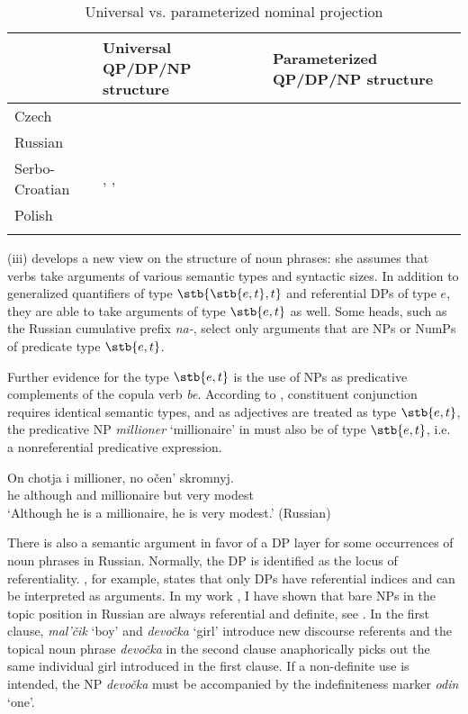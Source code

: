 \documentclass[output=paper,
colorlinks,
citecolor=brown,
newtxmath
]{langscibook}
\begin{document}
\begin{table}
\centering
\begin{tabularx}{\textwidth}{lQQ}
\lsptoprule
& Universal QP/DP/NP structure & Parameterized QP/DP/NP structure \tabularnewline
\midrule
Czech & \citet{Veselovska1995,Veselovska2001} & \citet{Corver1990} \tabularnewline
\midrule
Russian & \citet{Pereltsvaig2007,Pereltsvaig2013} &  \citet{Boskovic2005,Boskovic2008,Boskovic2009} \tabularnewline
\midrule
Serbo-Croatian & \citet{Progovac1998}, \citet{Basic2004}, \citet{Caruso2012,Caruso2013} & \citet{Zlatic1997,Zlatic1998} \tabularnewline
\midrule
Polish & \citet{Rutkowski2002} & \tabularnewline
\lspbottomrule
\end{tabularx}
\caption{Universal vs. parameterized nominal projection \citep[13]{Veselovska2014}}
\label{table:1}
\end{table}

(iii) \cite{Pereltsvaig2006} develops a new view on the structure of noun phrases: she assumes that verbs take arguments of various semantic types and syntactic sizes. In addition to generalized quantifiers of type $\stb{\stb{e, t}, t}$ and referential DPs of type $e$, they are able to take arguments of type $\stb{e, t}$ as well. Some heads, such as the Russian cumulative prefix \textit{na-}, select only arguments that are NPs or NumPs of predicate type $\stb{e, t}$.

Further evidence for the type $\stb{e, t}$ is the use of NPs as predicative complements of the copula verb \textit{be}. According to \cite{Partee1987}, constituent conjunction requires identical semantic types, and as adjectives are treated as type $\stb{e, t}$, the predicative NP \textit{millioner} `millionaire' in  must also be of type $\stb{e, t}$, i.e. a nonreferential predicative expression.

\ea \label{ex:1}
\gll On chotja i millioner, no očen' skromnyj. \\
    he although and millionaire but very modest\\
\glt `Although he is a millionaire, he is very modest.' \hfill (Russian)
\z

\noindent There is also a semantic argument in favor of a DP layer for some occurrences of noun phrases in Russian. Normally, the DP is identified as the locus of referentiality. \cite{Borer2005}, for example, states that only DPs have referential indices and can be interpreted as arguments. In my work \citep{Geist2010}, I have shown that bare NPs in the topic position in Russian are always referential and definite, see . In the first clause, \textit{mal'čik} `boy' and \textit{devočka} `girl' introduce new discourse referents and the topical noun phrase \textit{devočka} in the second clause anaphorically picks out the same individual girl introduced in the first clause. If a non-definite use is intended, the NP \textit{devočka} must be accompanied by the indefiniteness marker \textit{odin} `one'.
\end{document}
